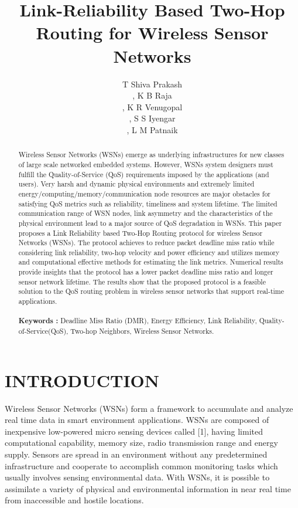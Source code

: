 \documentclass[fleqn,twoside]{article}
\title{\textbf{Link-Reliability Based Two-Hop Routing for Wireless Sensor Networks}}
\author{T Shiva Prakash\address[DCSE]{Department of Computer Science and Engineering, University Visvesvaraya College of\\ ~Engineering, Bangalore University, Bangalore 560 001 India, Contact: spt@ieee.org\\},
K B Raja\address[DECE]{Department of Electronics and Communication Engineering, University Visvesvaraya College of \\~Engineering, Bangalore University, Bangalore 560 001 India.\\},
K R Venugopal\address[DCSE]{Department of Computer Science and Engineering, University Visvesvaraya College of \\ ~Engineering, Bangalore University, Bangalore 560 001 India.\\},
S S Iyengar\address[DCSE]{Department of Computer Science, Louisiana State University, Baton Rouge, LA 70803, USA.\\},
L M Patnaik\address{Honorary Professor, Indian Institute of Science, Bangalore 560 012, India}}
\begin{document}
\begin{abstract}

Wireless Sensor Networks (WSNs) emerge as underlying infrastructures for new classes of large scale networked embedded systems. 
However, WSNs system designers must fulfill the Quality-of-Service (QoS) requirements imposed by the applications (and users). 
Very harsh and dynamic physical environments and extremely limited energy/computing/memory/communication node resources 
are major obstacles for satisfying QoS metrics such as reliability, timeliness and system lifetime. The limited communication 
range of WSN nodes, link asymmetry and the characteristics of the physical environment lead to a major source of QoS degradation 
in WSNs. This paper proposes a Link Reliability based Two-Hop Routing protocol for wireless Sensor Networks (WSNs). The protocol achieves to reduce packet deadline miss ratio while considering link reliability, two-hop velocity and power efficiency and utilizes memory and computational effective methods for estimating the link metrics. Numerical results provide insights that the protocol has a lower packet deadline miss ratio and longer sensor network lifetime. The results show that the proposed protocol is a feasible solution to the QoS routing problem in wireless sensor networks that support real-time applications. \\\\
{\bf Keywords :} Deadline Miss Ratio (DMR), Energy Efficiency, Link Reliability, Quality-of-Service(QoS), Two-hop Neighbors, Wireless Sensor Networks.
\end{abstract}

\maketitle


\section{INTRODUCTION}
\label{section:Introduction}
Wireless Sensor Networks (WSNs) form a framework to accumulate and analyze real time data in smart environment applications. WSNs are composed of inexpensive low-powered micro sensing devices called  [1], having limited computational capability, memory size, radio transmission range and energy supply. Sensors are spread in an environment without any predetermined infrastructure and cooperate to accomplish common monitoring tasks which usually involves sensing environmental data. With WSNs, it is possible to assimilate a variety of physical and environmental information in near real time from inaccessible and hostile locations. 
\end{document}
